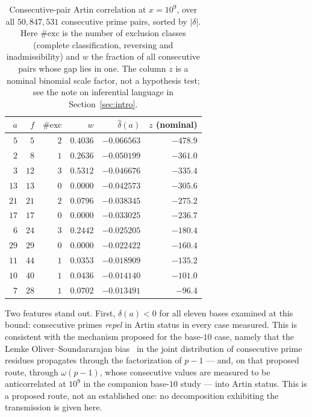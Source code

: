 \documentclass[11pt,reqno]{amsart}
\theoremstyle{plain}
\theoremstyle{definition}
\begin{document}
\begin{table}[t]
\centering
\caption{Consecutive-pair Artin correlation at $x = 10^9$, over all
$50{,}847{,}531$ consecutive prime pairs, sorted by $|\delta|$. Here
$\#\mathrm{exc}$ is the number of exclusion classes (complete classification,
reversing and inadmissibility) and $w$ the fraction of all consecutive pairs
whose gap lies in one. The column $z$ is a nominal binomial scale factor, not
a hypothesis test; see the note on inferential language in
Section~\ref{sec:intro}.}
\label{tab:delta}
\begin{tabular}{rrrrrr}
\toprule
$a$ & $f$ & $\#\mathrm{exc}$ & $w$ & $\widehat{\delta}(a)$ & $z$ (nominal) \\
\midrule
$5$  & $5$  & $2$ & $0.4036$ & $-0.066563$ & $-478.9$ \\
$2$  & $8$  & $1$ & $0.2636$ & $-0.050199$ & $-361.0$ \\
$3$  & $12$ & $3$ & $0.5312$ & $-0.046676$ & $-335.4$ \\
$13$ & $13$ & $0$ & $0.0000$ & $-0.042573$ & $-305.6$ \\
$21$ & $21$ & $2$ & $0.0796$ & $-0.038345$ & $-275.2$ \\
$17$ & $17$ & $0$ & $0.0000$ & $-0.033025$ & $-236.7$ \\
$6$  & $24$ & $3$ & $0.2442$ & $-0.025205$ & $-180.4$ \\
$29$ & $29$ & $0$ & $0.0000$ & $-0.022422$ & $-160.4$ \\
$11$ & $44$ & $1$ & $0.0353$ & $-0.018909$ & $-135.2$ \\
$10$ & $40$ & $1$ & $0.0436$ & $-0.014140$ & $-101.0$ \\
$7$  & $28$ & $1$ & $0.0702$ & $-0.013491$ & $-96.4$ \\
\bottomrule
\end{tabular}
\end{table}

Two features stand out. First, $\delta(a) < 0$ for all eleven bases examined at this bound:
consecutive primes \emph{repel} in Artin status in every case measured. This is consistent
with the mechanism proposed for the base-$10$ case, namely that the
Lemke Oliver--Soundararajan bias~\cite{LOS2016} in the joint distribution of
consecutive prime residues propagates through the factorization of $p-1$ ---
and, on that proposed route, through $\omega(p-1)$, whose consecutive values
are measured to be anticorrelated at $10^9$ in the companion base-$10$
study --- into Artin status. This is a proposed route, not an established one:
no decomposition exhibiting the transmission is given here.
\end{document}
